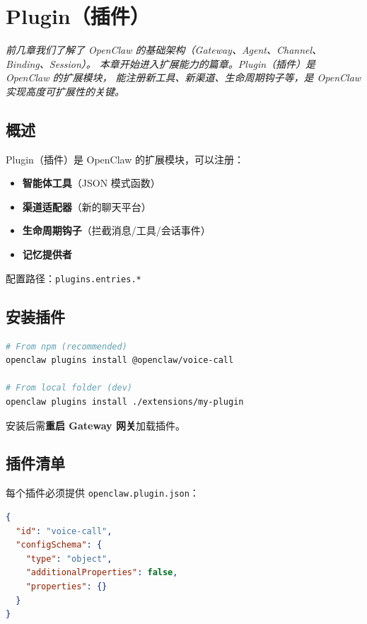 \chapter{Plugin（插件）}

\vspace{0.5em}
\noindent\textit{前几章我们了解了 OpenClaw 的基础架构（Gateway、Agent、Channel、Binding、Session）。
本章开始进入扩展能力的篇章。Plugin（插件）是 OpenClaw 的扩展模块，
能注册新工具、新渠道、生命周期钩子等，是 OpenClaw 实现高度可扩展性的关键。}
\vspace{0.5em}

\section{概述}

Plugin（插件）是 OpenClaw 的扩展模块，可以注册：

\begin{itemize}
  \item \textbf{智能体工具}（JSON 模式函数）
  \item \textbf{渠道适配器}（新的聊天平台）
  \item \textbf{生命周期钩子}（拦截消息/工具/会话事件）
  \item \textbf{记忆提供者}
\end{itemize}

配置路径：\texttt{plugins.entries.*}

\section{安装插件}

\begin{lstlisting}[language=bash]
# From npm (recommended)
openclaw plugins install @openclaw/voice-call

# From local folder (dev)
openclaw plugins install ./extensions/my-plugin
\end{lstlisting}

安装后需\textbf{重启 Gateway 网关}加载插件。

\section{插件清单}

每个插件必须提供 \texttt{openclaw.plugin.json}：

\begin{lstlisting}[language=json]
{
  "id": "voice-call",
  "configSchema": {
    "type": "object",
    "additionalProperties": false,
    "properties": {}
  }
}
\end{lstlisting}

